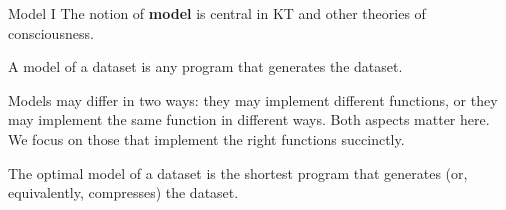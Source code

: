 


\begin{frame}[label=ladila]{Model I}
The notion of {\bf model} is central in KT and other theories of consciousness. \vfill

 
 \begin{definition}[Model]
 A  model of a dataset is any program that generates the dataset. 
 \end{definition}
Models may differ in two ways: they may implement different functions, or they may implement the same function in different ways. Both aspects matter here.  We focus on those that implement the right functions succinctly. \vfill 
 
\begin{definition}
The optimal model of a dataset is the shortest program that generates (or, equivalently, compresses) the dataset.
\end{definition}
\end{frame}


